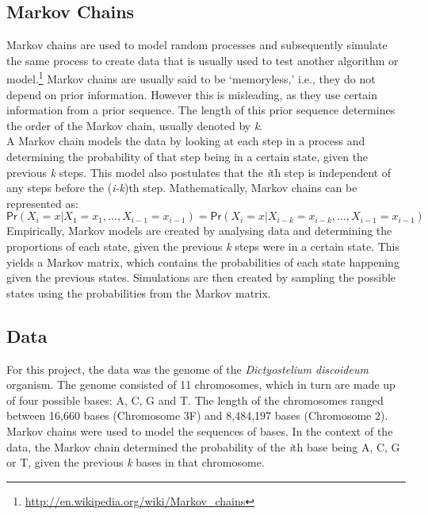 \documentclass[12pt]{article}
\newcommand{\prob}{\textsf{Pr}}
\begin{document}
\subsection{Markov Chains}
Markov chains are used to model random processes and subsequently simulate the same process to create data that is usually used to test another algorithm or model.\footnote{\url{http://en.wikipedia.org/wiki/Markov_chains}} Markov chains are usually said to be `memoryless,' i.e., they do not depend on prior information. However this is misleading, as they use certain information from a prior sequence. The length of this prior sequence determines the order of the Markov chain, usually denoted by \textit{k}.
\\[8pt]
A Markov chain models the data by looking at each step in a process and determining the probability of that step being in a certain state, given the previous \textit{k} steps. This model also postulates that the \textit{i}th step is independent of any steps before the (\textit{i-k})th step. Mathematically, Markov chains can be represented as:
$$
\prob(X_i = x | X_{1} = x_1, ..., X_{i-1} = x_{i-1}) = \prob(X_i = x | X_{i-k} = x_{i-k}, ..., X_{i-1} = x_{i-1})
$$
Empirically, Markov models are created by analysing data and determining the proportions of each state, given the previous \textit{k} steps were in a certain state. This yields a Markov matrix, which contains the probabilities of each state happening given the previous states. Simulations are then created by sampling the possible states using the probabilities from the Markov matrix.
\subsection{Data}
For this project, the data was the genome of the \textit{Dictyostelium discoideum} organism. The genome consisted of 11 chromosomes, which in turn are made up of four possible bases: A, C, G and T. The length of the chromosomes ranged between 16,660 bases (Chromosome 3F) and 8,484,197 bases (Chromosome 2). Markov chains were used to model the sequences of bases. In the context of the data, the Markov chain determined the probability of the \textit{i}th base being A, C, G or T, given the previous \textit{k} bases in that chromosome.
\end{document}
